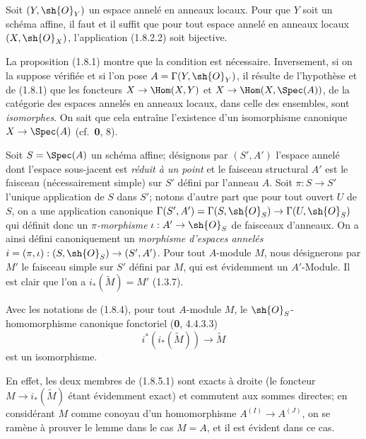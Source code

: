 \begin{corollary}[1.8.3]
\label{ega2:addendum:I.1.8.3-fr}
Soit $(Y,\sh{O}_Y)$ un espace annelé en anneaux locaux. Pour que $Y$
soit un schéma affine, il faut et il suffit que pour tout espace annelé
en anneaux locaux $(X,\sh{O}_X)$, l'application \textup{(1.8.2.2)} soit
bijective.
\end{corollary}

La proposition (1.8.1) montre que la condition est nécessaire.
Inversement, si on la suppose vérifiée et si l'on pose
$A=\Gamma(Y,\sh{O}_Y)$, il résulte de l'hypothèse et de (1.8.1) que les
foncteurs $X\to\Hom(X,Y)$ et
$X\to\Hom(X,\Spec(A))$, de la catégorie des espaces annelés en
anneaux locaux, dans celle des ensembles, sont \emph{isomorphes}. On sait que
cela entraîne l'existence d'un isomorphisme canonique
$X\to\Spec(A)$ (cf.~\textbf{0}, 8).

\begin{env}[1.8.4]
\label{ega2:addendum:I.1.8.4-fr}
Soit $S=\Spec(A)$ un schéma affine; désignons par $(S',A')$ l'espace
annelé dont l'espace sous-jacent est \emph{réduit à un point} et le faisceau
structural $A'$ est le faisceau (nécessairement simple) sur $S'$ défini
par l'anneau $A$. Soit $\pi:S\to S'$ l'unique application de $S$ dans
$S'$; notons d'autre part que pour tout ouvert $U$ de $S$, on a une
application canonique
$\Gamma(S',A')=\Gamma(S,\sh{O}_S)\to\Gamma(U,\sh{O}_S)$ qui définit
donc un \emph{$\pi$-morphisme} $\iota:A'\to\sh{O}_S$ de faisceaux d'anneaux.
On a ainsi défini canoniquement un \emph{morphisme d'espaces annelés}
$i=(\pi,\iota):(S,\sh{O}_S)\to(S',A')$. Pour tout $A$-module $M$, nous
désignerons par $M'$ le faisceau simple sur $S'$ défini par $M$, qui
est évidemment un $A'$-Module. Il est clair que l'on a
$i_*(\widetilde M)=M'$ (1.3.7).
\end{env}

\begin{lemma}[1.8.5]
\label{ega2:addendum:I.1.8.5-fr}
Avec les notations de \textup{(1.8.4)}, pour tout $A$-module $M$, le
$\sh{O}_S$-homomorphisme canonique fonctoriel \textup{(\textbf{0}, 4.4.3.3)}
\begin{equation}
\label{ega2:addendum:I.1.8.5.1-fr}
  i^*(i_*(\widetilde M))\to\widetilde M
\tag{1.8.5.1}
\end{equation}
est un isomorphisme.
\end{lemma}

En effet, les deux membres de (1.8.5.1) sont exacts à droite (le
foncteur $M\to i_*(\widetilde M)$ étant évidemment exact) et
commutent aux sommes directes; en considérant $M$ comme conoyau d'un
homomorphisme $A^{(I)}\to A^{(J)}$, on se ramène à prouver le lemme
dans le cas $M=A$, et il est évident dans ce cas.

